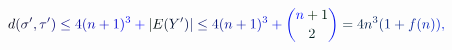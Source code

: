 \documentclass[12pt]{article}
\begin{document}
\makeatletter
\renewcommand*{\@textcolor}[3]{%
  \protect\leavevmode
  \begingroup
    \color#1{#2}#3%
  \endgroup
}
\makeatother
\begin{displaymath}
\mathcolor[RGB]{0,0,15}{d} \mathcolor[RGB]{0,0,30}{(} \mathcolor[RGB]{0,0,45}{\sigma} ^ { \mathcolor[RGB]{0,0,60}{\prime} } \mathcolor[RGB]{0,0,75}{,} \mathcolor[RGB]{0,0,90}{\tau} ^ { \mathcolor[RGB]{0,0,105}{\prime} } \mathcolor[RGB]{0,0,120}{)} \mathcolor[RGB]{0,0,135}{\leq} \mathcolor[RGB]{0,0,150}{4} \mathcolor[RGB]{0,0,165}{(} \mathcolor[RGB]{0,0,180}{n} \mathcolor[RGB]{0,0,195}{+} \mathcolor[RGB]{0,0,210}{1} \mathcolor[RGB]{0,0,225}{)} ^ { \mathcolor[RGB]{0,0,240}{3} } \mathcolor[RGB]{0,0,255}{+} \mathcolor[RGB]{0,15,0}{|} \mathcolor[RGB]{0,15,15}{E} \mathcolor[RGB]{0,15,30}{(} \mathcolor[RGB]{0,15,45}{Y} ^ { \mathcolor[RGB]{0,15,60}{\prime} } \mathcolor[RGB]{0,15,75}{)} \mathcolor[RGB]{0,15,90}{|} \mathcolor[RGB]{0,15,105}{\leq} \mathcolor[RGB]{0,15,120}{4} \mathcolor[RGB]{0,15,135}{(} \mathcolor[RGB]{0,15,150}{n} \mathcolor[RGB]{0,15,165}{+} \mathcolor[RGB]{0,15,180}{1} \mathcolor[RGB]{0,15,195}{)} ^ { \mathcolor[RGB]{0,15,210}{3} } \mathcolor[RGB]{0,15,225}{+} { \mathcolor[RGB]{0,15,240}{\binom { \mathcolor[RGB]{0,15,255}{n} \mathcolor[RGB]{0,30,0}{+} \mathcolor[RGB]{0,30,15}{1} } { \mathcolor[RGB]{0,30,30}{2} } } } \mathcolor[RGB]{0,30,45}{=} \mathcolor[RGB]{0,30,60}{4} \mathcolor[RGB]{0,30,75}{n} ^ { \mathcolor[RGB]{0,30,90}{3} } \mathcolor[RGB]{0,30,105}{(} \mathcolor[RGB]{0,30,120}{1} \mathcolor[RGB]{0,30,135}{+} \mathcolor[RGB]{0,30,150}{f} \mathcolor[RGB]{0,30,165}{(} \mathcolor[RGB]{0,30,180}{n} \mathcolor[RGB]{0,30,195}{)} \mathcolor[RGB]{0,30,210}{)} \mathcolor[RGB]{0,30,225}{,}
\end{displaymath}
\end{document}

